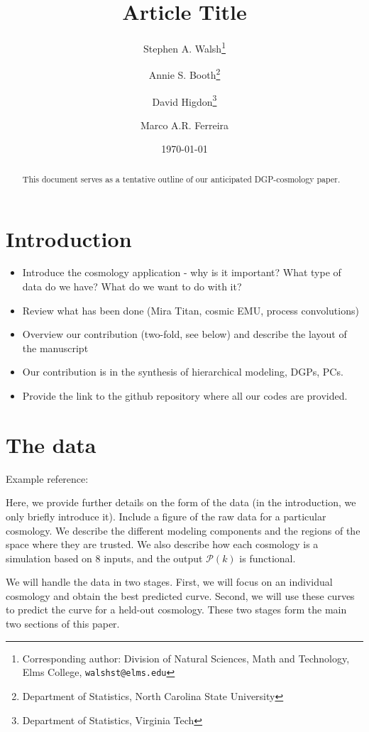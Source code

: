 \documentclass[11pt]{article}
\title{Article Title}
\author{Stephen A. Walsh\thanks{Corresponding author: Division of Natural Sciences, 
        Math and Technology, Elms College, {\tt walshst@elms.edu}} \and 
        Annie S. Booth\thanks{Department of Statistics, North Carolina State University} \and
        David Higdon\thanks{Department of Statistics, Virginia Tech} \and
        Marco A.R. Ferreira\footnotemark[3]}
\date{\today}
\begin{document}
\maketitle
\bigskip

\begin{abstract} 
This document serves as a tentative outline of our anticipated DGP-cosmology paper.
\end{abstract}


\section{Introduction}

\begin{itemize}
    \item Introduce the cosmology application - why is it important?  What type of data do we have?  What do we want to do with it?
    \item Review what has been done (Mira Titan, cosmic EMU, process convolutions)
    \item Overview our contribution (two-fold, see below) and describe the layout of the manuscript
    \item Our contribution is in the synthesis of hierarchical modeling, DGPs, PCs.
    \item Provide the link to the github repository where all our codes are provided.
\end{itemize}

\section{The data}

Example reference: \citep{damianou2013deep}

Here, we provide further details on the form of the data (in the introduction, we only briefly introduce it).  Include a figure of the raw data for a particular cosmology.  We describe the different modeling components and the regions of the space where they are trusted.  We also describe how each cosmology is a simulation based on 8 inputs, and the output $\mathcal{P}(k)$ is functional.

We will handle the data in two stages.  First, we will focus on an individual cosmology and obtain the best predicted curve.  Second, we will use these curves to predict the curve for a held-out cosmology.  These two stages form the main two sections of this paper.
\end{document}
